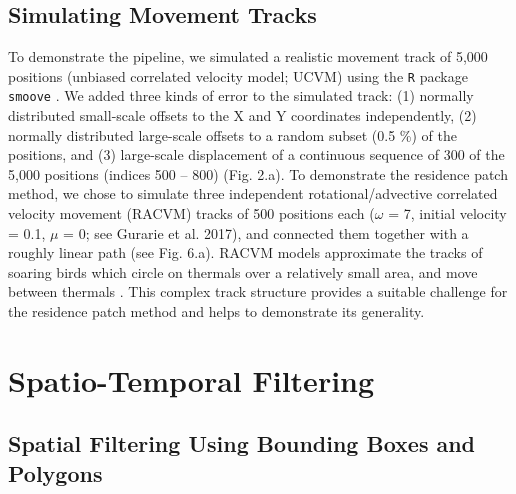 \documentclass[10pt,paper=a4,headings=standardclasses
]{scrartcl}
\begin{document}
\subsection{Simulating Movement Tracks}

To demonstrate the pipeline, we simulated a realistic movement track of 5,000 positions (unbiased correlated velocity model; UCVM) using the \texttt{R} package \texttt{smoove} \citep[][see Fig. 2.a]{gurarie2017}.
We added three kinds of error to the simulated track: (1) normally distributed small-scale offsets to the X and Y coordinates independently, (2) normally distributed large-scale offsets to a random subset (0.5 \%) of the positions, and (3) large-scale displacement of a continuous sequence of 300 of the 5,000 positions (indices 500 -- 800) (Fig. 2.a).
To demonstrate the residence patch method, we chose to simulate three independent rotational/advective correlated velocity movement (RACVM) tracks of 500 positions each ($\omega$ = 7, initial velocity = 0.1, $\mu$ = 0; see Gurarie et al. 2017), and connected them together with a roughly linear path (see Fig. 6.a).
RACVM models approximate the tracks of soaring birds which circle on thermals over a relatively small area, and move between thermals \citep[`thermalling'; ][]{gurarie2017, harel2016}.
This complex track structure provides a suitable challenge for the residence patch method and helps to demonstrate its generality.

\section{Spatio-Temporal Filtering}

\subsection{Spatial Filtering Using Bounding Boxes and Polygons}
\end{document}
